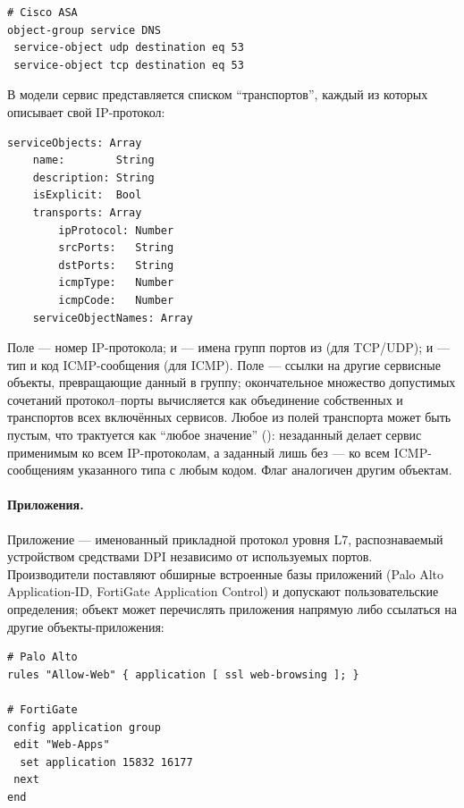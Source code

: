\begin{verbatim}
# Cisco ASA
object-group service DNS
 service-object udp destination eq 53
 service-object tcp destination eq 53
\end{verbatim}

В модели сервис представляется списком ``транспортов'', каждый из которых описывает свой IP-протокол:

\begin{lstlisting}[style=schemastyle]
serviceObjects: Array
    name:        String
    description: String
    isExplicit:  Bool
    transports: Array
        ipProtocol: Number
        srcPorts:   String
        dstPorts:   String
        icmpType:   Number
        icmpCode:   Number
    serviceObjectNames: Array
\end{lstlisting}

Поле  --- номер IP-протокола;  и  --- имена групп портов из  (для TCP/UDP);  и  --- тип и код ICMP-сообщения (для ICMP). Поле  --- ссылки на другие сервисные объекты, превращающие данный в группу; окончательное множество допустимых сочетаний протокол--порты вычисляется как объединение собственных  и транспортов всех включённых сервисов. Любое из полей транспорта может быть пустым, что трактуется как ``любое значение'' (): незаданный  делает сервис применимым ко всем IP-протоколам, а заданный лишь  без  --- ко всем ICMP-сообщениям указанного типа с любым кодом. Флаг  аналогичен другим объектам.

\paragraph{Приложения.} Приложение --- именованный прикладной протокол уровня L7, распознаваемый устройством средствами DPI независимо от используемых портов. Производители поставляют обширные встроенные базы приложений (Palo Alto Application-ID, FortiGate Application Control) и допускают пользовательские определения; объект может перечислять приложения напрямую либо ссылаться на другие объекты-приложения:

\begin{verbatim}
# Palo Alto
rules "Allow-Web" { application [ ssl web-browsing ]; }

# FortiGate
config application group
 edit "Web-Apps"
  set application 15832 16177
 next
end
\end{verbatim}

